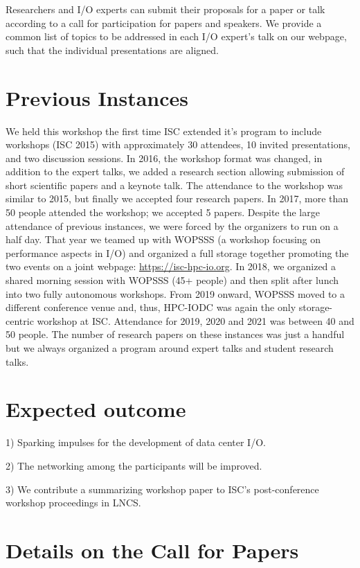 \documentclass[a4paper,10pt]{article}
\begin{document}
Researchers and I/O experts can submit their proposals for a paper or talk according to a call for participation for papers and speakers.
We provide a common list of topics to be addressed in each I/O expert's talk on our webpage, such that the individual presentations are aligned.



\section{Previous Instances}

We held this workshop the first time ISC extended it's program to include workshops (ISC 2015) with approximately 30 attendees, 10 invited presentations, and two discussion sessions.
In 2016, the workshop format was changed, in addition to the expert talks, we added a research section allowing submission of short scientific papers and a keynote talk.
The attendance to the workshop was similar to 2015, but finally we accepted four research papers.
In 2017, more than 50 people attended the workshop; we accepted 5 papers. %
Despite the large attendance of previous instances, we were forced by the organizers to run on a half day.
That year we teamed up with WOPSSS (a workshop focusing on performance aspects in I/O) and organized a full storage together promoting the two events on a joint webpage: \url{https://isc-hpc-io.org}.
In 2018, we organized a shared morning session with WOPSSS (45+ people) and then split after lunch into two fully autonomous workshops.
From 2019 onward, WOPSSS moved to a different conference venue and, thus, HPC-IODC was again the only storage-centric workshop at ISC.
Attendance for 2019, 2020 and 2021 was between 40 and 50 people.
The number of research papers on these instances was just a handful but we always organized a program around expert talks and student research talks.

\section{Expected outcome}
1) Sparking impulses for the development of data center I/O.

2) The networking among the participants will be improved.

3) We contribute a summarizing workshop paper to ISC's post-conference workshop proceedings in LNCS.

\section{Details on the Call for Papers}
\end{document}
